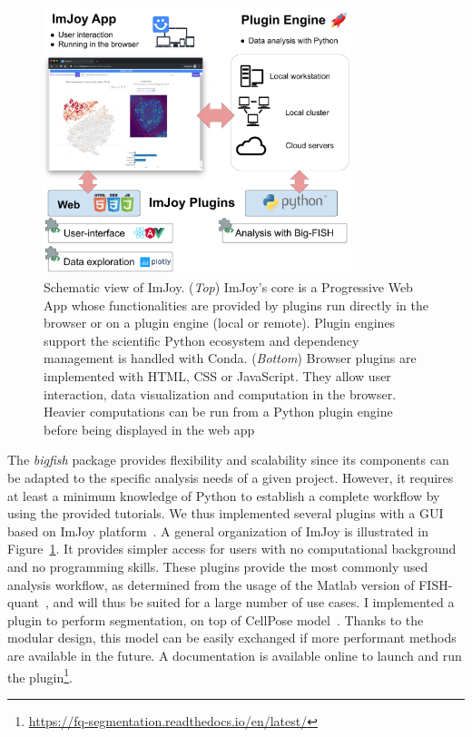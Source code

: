 \begin{figure}[h]
    \centering
    \includegraphics[width=0.8\textwidth]{figures/chapter1/schema_imjoy}
    \caption{Schematic view of ImJoy.
	(\textit{Top}) ImJoy's core is a Progressive Web App whose functionalities are provided by plugins run directly in the browser or on a plugin engine (local or remote).
	Plugin engines support the scientific Python ecosystem and dependency management is handled with Conda.
	(\textit{Bottom}) Browser plugins are implemented with HTML, CSS or JavaScript.
	They allow user interaction, data visualization and computation in the browser.
	Heavier computations can be run from a Python plugin engine before being displayed in the web app}
    \label{fig:imjoy}
\end{figure}

The \emph{bigfish} package provides flexibility and scalability since its components can be adapted to the specific analysis needs of a given project.
However, it requires at least a minimum knowledge of Python to establish a complete workflow by using the provided tutorials.
We thus implemented several plugins with a \ac{GUI} based on ImJoy platform~\cite{ouyang_imjoy_2019}.
A general organization of ImJoy is illustrated in Figure~\ref{fig:imjoy}.
It provides simpler access for users with no computational background and no programming skills.
These plugins provide the most commonly used analysis workflow, as determined from the usage of the Matlab version of FISH-quant~\cite{mueller_fish-quant_2013}, and will thus be suited for a large number of use cases.
I implemented a plugin to perform segmentation, on top of CellPose model~\cite{stringer_cellpose_2021}.
Thanks to the modular design, this model can be easily exchanged if more performant methods are available in the future.
A documentation is available online to launch and run the plugin\footnote{\url{https://fq-segmentation.readthedocs.io/en/latest/}}.

